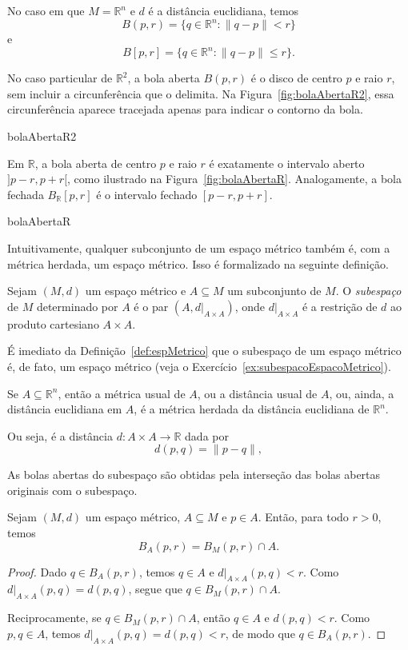 \begin{example}
    No caso em que $M=\mathbb R^n$ e $d$ é a distância euclidiana, temos
    \[
        B(p,r)=\{q\in\mathbb R^n:\|q-p\|<r\}
    \]
    e
    \[
        B[p,r]=\{q\in\mathbb R^n:\|q-p\|\leq r\}.
    \]

    No caso particular de $\mathbb R^2$, a bola aberta $B(p,r)$ é o disco de centro $p$ e raio $r$, sem incluir a circunferência que o delimita.
    Na Figura~\ref{fig:bolaAbertaR2}, essa circunferência aparece tracejada apenas para indicar o contorno da bola.

{bolaAbertaR2}

    Em $\mathbb R$, a bola aberta de centro $p$ e raio $r$ é exatamente o intervalo aberto $]p-r, p+r[$, como ilustrado na Figura~\ref{fig:bolaAbertaR}.
    Analogamente, a bola fechada $B_{\mathbb R}[p,r]$ é o intervalo fechado $[p-r,p+r]$.

{bolaAbertaR}
\end{example}


Intuitivamente, qualquer subconjunto de um espaço métrico também é, com a métrica herdada, um espaço métrico.
Isso é formalizado na seguinte definição.

\begin{definition}
    Sejam $(M,d)$ um espaço métrico e $A\subseteq M$ um subconjunto de $M$.
    O \emph{subespaço} de $M$ determinado por $A$ é o par $(A, d|_{A\times A})$, onde $d|_{A\times A}$ é a restrição de $d$ ao produto cartesiano $A\times A$.
\end{definition}

É imediato da Definição~\ref{def:espMetrico} que o subespaço de um espaço métrico é, de fato, um espaço métrico (veja o Exercício~\ref{ex:subespacoEspacoMetrico}).

\begin{definition}
    Se $A\subseteq \mathbb R^n$, então a métrica usual de $A$, ou a distância usual de $A$, ou, ainda, a distância euclidiana em $A$, é a métrica herdada da distância euclidiana de $\mathbb R^n$.

    Ou seja, é a distância $d:A\times A\to \mathbb R$ dada por
    \[
        d(p,q)=\|p-q\|,
    \]
\end{definition}

As bolas abertas do subespaço são obtidas pela interseção das bolas abertas originais com o subespaço.

\begin{proposition}
    Sejam $(M,d)$ um espaço métrico, $A\subseteq M$ e $p\in A$.
    Então, para todo $r>0$, temos
    \[
        B_A(p,r)=B_M(p,r)\cap A.
    \]
\end{proposition}
\begin{proof}
    Dado $q \in B_A(p,r)$, temos $q\in A$ e $d|_{A\times A}(p,q)<r$.
    Como $d|_{A\times A}(p,q)=d(p,q)$, segue que $q \in B_M(p,r)\cap A$.

    Reciprocamente, se $q \in B_M(p,r)\cap A$, então $q\in A$ e $d(p,q)<r$.
    Como $p,q\in A$, temos $d|_{A\times A}(p,q)=d(p,q)<r$, de modo que $q \in B_A(p,r)$.
\end{proof}

